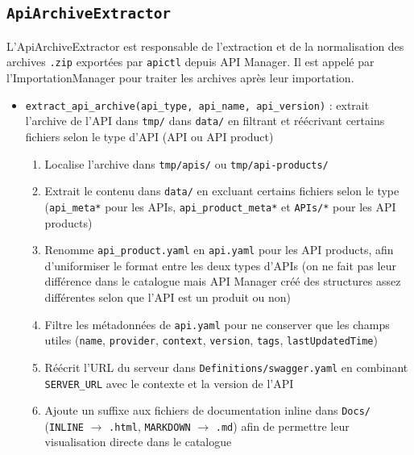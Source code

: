 
\subsection{\texttt{ApiArchiveExtractor}}
L'ApiArchiveExtractor est responsable de l'extraction et de la normalisation des archives \texttt{.zip} exportées par \texttt{apictl} depuis API Manager. Il est appelé par l'ImportationManager pour traiter les archives après leur importation.

\begin{itemize}
    \item[$\bullet$] \texttt{extract\_api\_archive(api\_type, api\_name, api\_version)} : extrait l'archive de l'API dans \texttt{tmp/} dans \texttt{data/} en filtrant et réécrivant certains fichiers selon le type d'API (API ou API product)
        \begin{enumerate}
            \item Localise l'archive dans \texttt{tmp/apis/} ou \texttt{tmp/api-products/}
            \item Extrait le contenu dans \texttt{data/} en excluant certains fichiers selon le type (\texttt{api\_meta*} pour les APIs, \texttt{api\_product\_meta*} et \texttt{APIs/*} pour les API products)
            \item Renomme \texttt{api\_product.yaml} en \texttt{api.yaml} pour les API products, afin d'uniformiser le format entre les deux types d'APIs (on ne fait pas leur différence dans le catalogue mais API Manager créé des structures assez différentes selon que l'API est un produit ou non)
            \item Filtre les métadonnées de \texttt{api.yaml} pour ne conserver que les champs utiles (\texttt{name}, \texttt{provider}, \texttt{context}, \texttt{version}, \texttt{tags}, \texttt{lastUpdatedTime})
            \item Réécrit l'URL du serveur dans \texttt{Definitions/swagger.yaml} en combinant\\ \texttt{SERVER\_URL} avec le contexte et la version de l'API
            \item Ajoute un suffixe aux fichiers de documentation inline dans \texttt{Docs/} (\texttt{INLINE} $\rightarrow$ \texttt{.html}, \texttt{MARKDOWN} $\rightarrow$ \texttt{.md}) afin de permettre leur visualisation directe dans le catalogue
        \end{enumerate}
\end{itemize}

